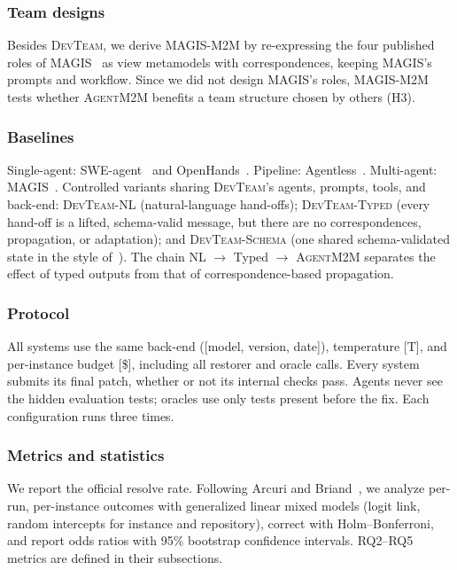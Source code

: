 \documentclass[10pt, anonymous, conference]{IEEEtran}
\theoremstyle{definition}
\theoremstyle{plain}
\theoremstyle{remark}
\newcommand{\tool}{\textsc{AgentM2M}}
\newcommand{\devteam}{\textsc{DevTeam}}
\newcommand{\fixme}[1]{{\color{red}[#1]}}
\begin{document}
\subsubsection{Team designs}
Besides \devteam{}, we derive \textsc{MAGIS-M2M} by re-expressing the four
published roles of MAGIS~\cite{tao2024magis} as view metamodels with
correspondences, keeping MAGIS's prompts and workflow. Since we did not design
MAGIS's roles, \textsc{MAGIS-M2M} tests whether \tool{} benefits a team
structure chosen by others (H3).

\subsubsection{Baselines}
Single-agent: SWE-agent~\cite{yang2024sweagent} and
OpenHands~\cite{wang2025openhands}. Pipeline:
Agentless~\cite{xia2025agentless}. Multi-agent: MAGIS~\cite{tao2024magis}.
Controlled variants sharing \devteam{}'s agents, prompts, tools, and back-end:
\textsc{DevTeam-NL} (natural-language hand-offs);
\textsc{DevTeam-Typed} (every hand-off is a lifted, schema-valid message, but
there are no correspondences, propagation, or adaptation); and
\textsc{DevTeam-Schema} (one shared schema-validated state in the style
of~\cite{zhang2026patchboard}). The chain NL $\to$ Typed $\to$ \tool{}
separates the effect of typed outputs from that of correspondence-based
propagation.

\subsubsection{Protocol}
All systems use the same back-end (\fixme{model, version, date}), temperature
\fixme{T}, and per-instance budget \fixme{\$}, including all restorer and
oracle calls. Every system submits its final patch, whether or not its
internal checks pass. Agents never see the hidden evaluation tests; oracles use
only tests present before the fix. Each configuration runs three times.

\subsubsection{Metrics and statistics}
We report the official resolve rate. Following Arcuri and
Briand~\cite{arcuri2011practical}, we analyze per-run, per-instance outcomes
with generalized linear mixed models (logit link, random intercepts for
instance and repository), correct with Holm--Bonferroni, and report odds ratios
with 95\% bootstrap confidence intervals. RQ2--RQ5 metrics are defined in
their subsections.
\end{document}
